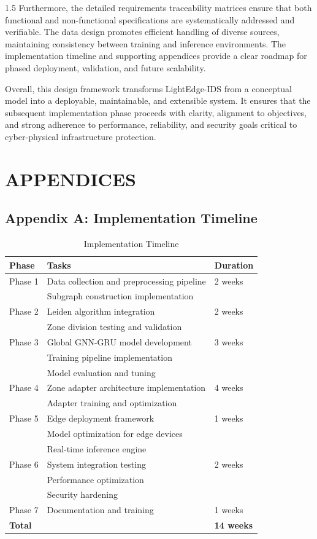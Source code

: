 \begin{spacing}{1.5}
Furthermore, the detailed requirements traceability matrices ensure that both functional and non-functional specifications are systematically addressed and verifiable. The data design promotes efficient handling of diverse sources, maintaining consistency between training and inference environments. The implementation timeline and supporting appendices provide a clear roadmap for phased deployment, validation, and future scalability.

Overall, this design framework transforms LightEdge-IDS from a conceptual model into a deployable, maintainable, and extensible system. It ensures that the subsequent implementation phase proceeds with clarity, alignment to objectives, and strong adherence to performance, reliability, and security goals critical to cyber-physical infrastructure protection.

\clearpage
\section{APPENDICES}


\subsection{Appendix A: Implementation Timeline}

\begin{table}[htbp]
\centering
\begin{tabular}{|l|l|l|}
\hline
\textbf{Phase} & \textbf{Tasks} & \textbf{Duration} \\
\hline
Phase 1 & Data collection and preprocessing pipeline & 2 weeks \\
 & Subgraph construction implementation & \\
\hline
Phase 2 & Leiden algorithm integration &  2 weeks \\
 & Zone division testing and validation & \\
\hline
Phase 3 & Global GNN-GRU model development & 3 weeks \\
 & Training pipeline implementation & \\
 & Model evaluation and tuning & \\
\hline
Phase 4 & Zone adapter architecture implementation & 4 weeks \\
 & Adapter training and optimization & \\
\hline
Phase 5 & Edge deployment framework & 1 weeks \\
 & Model optimization for edge devices & \\
 & Real-time inference engine & \\
\hline
Phase 6 & System integration testing & 2 weeks \\
 & Performance optimization & \\
 & Security hardening & \\
\hline
Phase 7 & Documentation and training & 1 weeks 
 \\
\hline
\textbf{Total} & & \textbf{14 weeks} \\
\hline
\end{tabular}
\caption{Implementation Timeline}
\end{table}
\newpage

\end{spacing}
